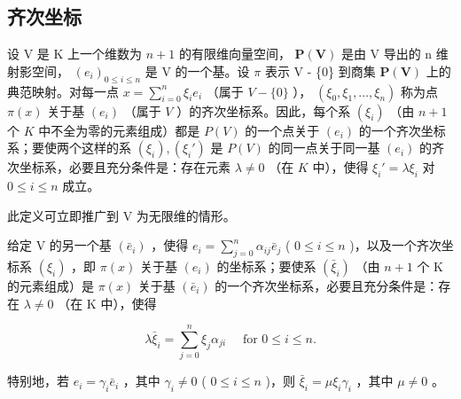 \subsection{齐次坐标}

设 V 是 K 上一个维数为 \(n + 1\) 的有限维向量空间， \(\mathbf{P}(\mathbf{V})\) 是由 V 导出的 n 维射影空间， \((e_{i})_{0 \leqslant i \leqslant n}\) 是 V 的一个基。设 \(\pi\) 表示 V - \{0\} 到商集 \(\mathbf{P}(\mathbf{V})\) 上的典范映射。对每一点 \(x = \sum_{i=0}^{n} \xi_i e_i\) （属于 \(V - \{0\}\) ）， \((\xi_0, \xi_1, \ldots, \xi_n)\) 称为点 \(\pi(x)\) 关于基 \((e_i)\) （属于 \(V\) ）的齐次坐标系。因此，每个系 \((\xi_i)\) （由 \(n + 1\) 个 \(K\) 中不全为零的元素组成）都是 \(P(V)\) 的一个点关于 \((e_i)\) 的一个齐次坐标系；要使两个这样的系 \((\xi_i), (\xi_i')\) 是 \(P(V)\) 的同一点关于同一基 \((e_i)\) 的齐次坐标系，必要且充分条件是：存在元素 \(\lambda \neq 0\) （在 \(K\) 中），使得 \(\xi_i' = \lambda \xi_i\) 对 \(0 \leqslant i \leqslant n\) 成立。

此定义可立即推广到 V 为无限维的情形。

给定 V 的另一个基 \((\bar{e}_i)\) ，使得 \(e_i = \sum_{j=0}^{n} \alpha_{ij} \bar{e}_j\) ( \(0 \leqslant i \leqslant n\) )，以及一个齐次坐标系 \((\xi_i)\) ，即 \(\pi(x)\) 关于基 \((e_i)\) 的坐标系；要使系 \((\bar{\xi}_i)\) （由 \(n+1\) 个 K 的元素组成）是 \(\pi(x)\) 关于基 \((\bar{e}_i)\) 的一个齐次坐标系，必要且充分条件是：存在 \(\lambda \neq 0\) （在 K 中），使得

\[
\lambda \bar {\xi} _ {i} = \sum_ {j = 0} ^ {n} \xi_ {j} \alpha_ {j i} \quad \text { for } 0 \leqslant i \leqslant n.
\]

特别地，若 \(e_i = \gamma_i \bar{e}_i\) ，其中 \(\gamma_i \neq 0\) ( \(0 \leqslant i \leqslant n\) )，则 \(\bar{\xi}_i = \mu \xi_i \gamma_i\) ，其中 \(\mu \neq 0\) 。

